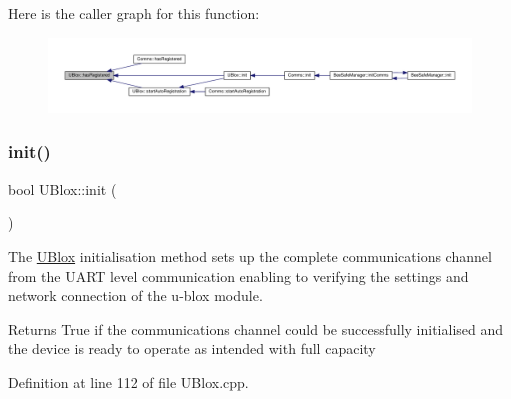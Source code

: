 Here is the caller graph for this function\+:
\nopagebreak
\begin{figure}[H]
\begin{center}
\leavevmode
\includegraphics[width=350pt]{da/df6/class_u_blox_a1889c2b9bb6087bc939bd2a27b68623b_icgraph}
\end{center}
\end{figure}
\mbox{\label{class_u_blox_a34c2f507ff3bbd21b9aea788a015527a}} 
\subsubsection{\texorpdfstring{init()}{init()}}
{\footnotesize\ttfamily bool U\+Blox\+::init (\begin{DoxyParamCaption}{ }\end{DoxyParamCaption})}

The \hyperlink{class_u_blox}{U\+Blox} initialisation method sets up the complete communications channel from the U\+A\+RT level communication enabling to verifying the settings and network connection of the u-\/blox module.

\begin{DoxyReturn}{Returns}
True if the communications channel could be successfully initialised and the device is ready to operate as intended with full capacity 
\end{DoxyReturn}


Definition at line 112 of file U\+Blox.\+cpp.


